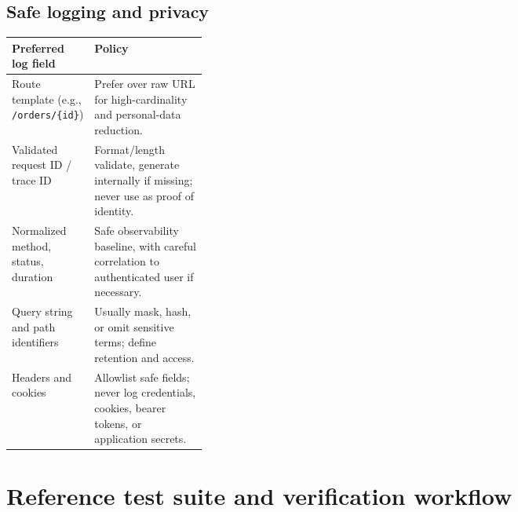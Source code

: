 \documentclass[10pt,letterpaper,oneside]{article}
\newcommand{\code}[1]{\texttt{#1}}
\begin{document}
\subsection{Safe logging and privacy}
\begin{tabularx}{\linewidth}{P{0.29\linewidth}Y}
\toprule\textbf{Preferred log field} & \textbf{Policy}\\\midrule
Route template (e.g., \code{/orders/\{id\}}) & Prefer over raw URL for high-cardinality and personal-data reduction.\\
Validated request ID / trace ID & Format/length validate, generate internally if missing; never use as proof of identity.\\
Normalized method, status, duration & Safe observability baseline, with careful correlation to authenticated user if necessary.\\
Query string and path identifiers & Usually mask, hash, or omit sensitive terms; define retention and access.\\
Headers and cookies & Allowlist safe fields; never log credentials, cookies, bearer tokens, or application secrets.\\
\bottomrule
\end{tabularx}

\section{Reference test suite and verification workflow}
\end{document}
